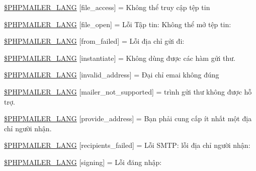 \begin{DoxyCompactItemize}
\hyperlink{phpmailer_8lang-vi_8php_a7e83349023b856ef9e5c46e30ae6d51e}{\$\+P\+H\+P\+M\+A\+I\+L\+E\+R\+\_\+\+L\+A\+NG} \mbox{[}\textquotesingle{}file\+\_\+access\textquotesingle{}\mbox{]} = \textquotesingle{}Không thể truy cập tệp tin \textquotesingle{}
\item 
\hyperlink{phpmailer_8lang-vi_8php_a28d1a6517bf4c942a0ddd506188ad2e0}{\$\+P\+H\+P\+M\+A\+I\+L\+E\+R\+\_\+\+L\+A\+NG} \mbox{[}\textquotesingle{}file\+\_\+open\textquotesingle{}\mbox{]} = \textquotesingle{}Lỗi Tập tin\+: Không thể mở tệp tin\+: \textquotesingle{}
\item 
\hyperlink{phpmailer_8lang-vi_8php_adf832ae12155a09be077c6d5e4fd7e22}{\$\+P\+H\+P\+M\+A\+I\+L\+E\+R\+\_\+\+L\+A\+NG} \mbox{[}\textquotesingle{}from\+\_\+failed\textquotesingle{}\mbox{]} = \textquotesingle{}Lỗi địa chỉ gửi đi\+: \textquotesingle{}
\item 
\hyperlink{phpmailer_8lang-vi_8php_ad58dde16780f4770ccf4dd282ea1f5ad}{\$\+P\+H\+P\+M\+A\+I\+L\+E\+R\+\_\+\+L\+A\+NG} \mbox{[}\textquotesingle{}instantiate\textquotesingle{}\mbox{]} = \textquotesingle{}Không dùng được các hàm gửi thư.\textquotesingle{}
\item 
\hyperlink{phpmailer_8lang-vi_8php_a42d61bcea4c79599ecb44fd062f54d47}{\$\+P\+H\+P\+M\+A\+I\+L\+E\+R\+\_\+\+L\+A\+NG} \mbox{[}\textquotesingle{}invalid\+\_\+address\textquotesingle{}\mbox{]} = \textquotesingle{}Đại chỉ emai không đúng\textquotesingle{}
\item 
\hyperlink{phpmailer_8lang-vi_8php_aa2ebcb8833ee83a7ad67401c4bb3a6ad}{\$\+P\+H\+P\+M\+A\+I\+L\+E\+R\+\_\+\+L\+A\+NG} \mbox{[}\textquotesingle{}mailer\+\_\+not\+\_\+supported\textquotesingle{}\mbox{]} = \textquotesingle{} trình gửi thư không được hỗ trợ.\textquotesingle{}
\item 
\hyperlink{phpmailer_8lang-vi_8php_a8b97897c2406b7392b056f375feeefbb}{\$\+P\+H\+P\+M\+A\+I\+L\+E\+R\+\_\+\+L\+A\+NG} \mbox{[}\textquotesingle{}provide\+\_\+address\textquotesingle{}\mbox{]} = \textquotesingle{}Bạn phải cung cấp ít nhất một địa chỉ người nhận.\textquotesingle{}
\item 
\hyperlink{phpmailer_8lang-vi_8php_a7589d30bb9b368327c2df015f3e6bcba}{\$\+P\+H\+P\+M\+A\+I\+L\+E\+R\+\_\+\+L\+A\+NG} \mbox{[}\textquotesingle{}recipients\+\_\+failed\textquotesingle{}\mbox{]} = \textquotesingle{}Lỗi S\+M\+T\+P\+: lỗi địa chỉ người nhận\+: \textquotesingle{}
\item 
\hyperlink{phpmailer_8lang-vi_8php_a68e437bdb9b968a5a67320f03d231565}{\$\+P\+H\+P\+M\+A\+I\+L\+E\+R\+\_\+\+L\+A\+NG} \mbox{[}\textquotesingle{}signing\textquotesingle{}\mbox{]} = \textquotesingle{}Lỗi đăng nhập\+: \textquotesingle{}

\end{DoxyCompactItemize}

